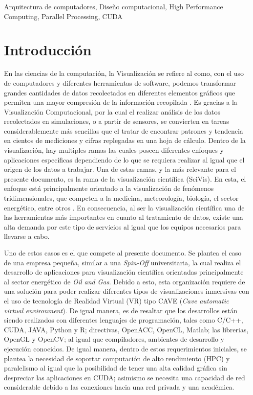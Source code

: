 \documentclass[conference,onecolumn]{IEEEtran}
\begin{document}
\begin{IEEEkeywords}
    \centering
    Arquitectura de computadores, Diseño computacional, High Performance Computing, Parallel Processing, CUDA
\end{IEEEkeywords}

\section{Introducción}
En las ciencias de la computación, la Visualización se refiere al como, con el uso de computadores y diferentes herramientas de software, podemos transformar grandes cantidades de datos recolectados en diferentes elementos gráficos que permiten una mayor compresión de la información recopilada \cite[Pág. 150]{vis}. Es gracias a la Visualización Computacional, por la cual el realizar análisis de los datos recolectados en simulaciones, o a partir de sensores, se convierten en tareas considerablemente más sencillas que el tratar de encontrar patrones y tendencia en cientos de mediciones y cifras replegadas en una hoja de cálculo. Dentro de la visualización, hay multiples ramas las cuales poseen diferentes enfoques y aplicaciones específicas dependiendo de lo que se requiera realizar al igual que el origen de los datos a trabajar. Una de estas ramas, y la más relevante para el presente documento, es la rama de la visualización científica (SciVis). En esta, el enfoque está principalmente orientado a la visualización de fenómenos tridimensionales, que competen a la medicina, meteorología, biología, el sector energético, entre otros \cite{SciVis}. En consecuencia, al ser la visualización científica una de las herramientas más importantes en cuanto al tratamiento de datos, existe una alta demanda por este tipo de servicios al igual que los equipos necesarios para llevarse a cabo. \medbreak 

Uno de estos casos es el que compete al presente documento. Se plantea el caso de una empresa pequeña, similar a una \textit{Spin-Off} universitaria, la cual realiza el desarrollo de aplicaciones para visualización científica orientadas principalmente al sector energético de \textit{Oil and Gas}. Debido a esto, esta organización requiere de una solución para poder realizar diferentes tipos de visualizaciones inmersivas con el uso de tecnología de Realidad Virtual (VR) tipo CAVE (\textit{Cave automatic virtual environment}). De igual manera, es de resaltar que los desarrollos están siendo realizados con diferentes lenguajes de programación, tales como C/C++, CUDA, JAVA, Python y R; directivas, OpenACC, OpenCL, Matlab; las librerias, OpenGL y OpenCV; al igual que compiladores, ambientes de desarrollo y ejecución conocidos. De igual manera, dentro de estos requerimientos iniciales, se plantea la necesidad de soportar computación de alto rendimiento (HPC) y paralelismo al igual que la posibilidad de tener una alta calidad gráfica sin despreciar las aplicaciones en CUDA; asimismo se necesita una capacidad de red considerable debido a las conexiones hacia una red privada y una académica.
\cite{arqCom}  \medbreak
\end{document}

